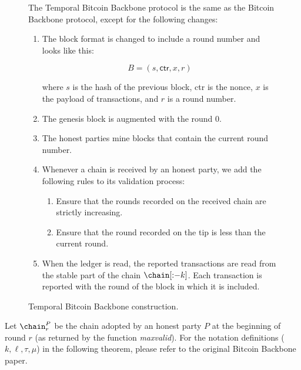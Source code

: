\begin{figure}

  The Temporal Bitcoin Backbone protocol is the same as the Bitcoin Backbone protocol, except
  for the following changes:

  \begin{enumerate}
    \item The block format is changed to include a round number and looks like this:

    \[
      B = (s, \textsf{ctr}, x, r)
    \]

    where $s$ is the hash of the previous block, \textsf{ctr} is the nonce, $x$ is the
    payload of transactions, and $r$ is a round number.

    \item The genesis block is augmented with the round $0$.
    \item The honest parties mine blocks that contain the current round number.
    \item Whenever a chain is received by an honest party, we add the following rules to
          its validation process:

          \begin{enumerate}
            \item Ensure that the rounds recorded on the received chain are strictly
                  increasing.
            \item Ensure that the round recorded on the tip is less than the current round.
          \end{enumerate}
    \item When the ledger is \textsf{read}, the reported transactions are read from the
          stable part of the chain $\chain[{:}{-k}]$. Each transaction is reported with the
          round of the block in which it is included.
  \end{enumerate}
  \caption{Temporal Bitcoin Backbone construction.}
  \label{fig.temporal-backbone}
\end{figure}

Let $\chain^P_r$ be the chain adopted by an honest party $P$ at the
beginning of round $r$ (as returned by the function \emph{maxvalid}).
For the notation definitions ($k, \ell, \tau, \mu$)
in the following theorem, please refer to the original Bitcoin
Backbone paper.

